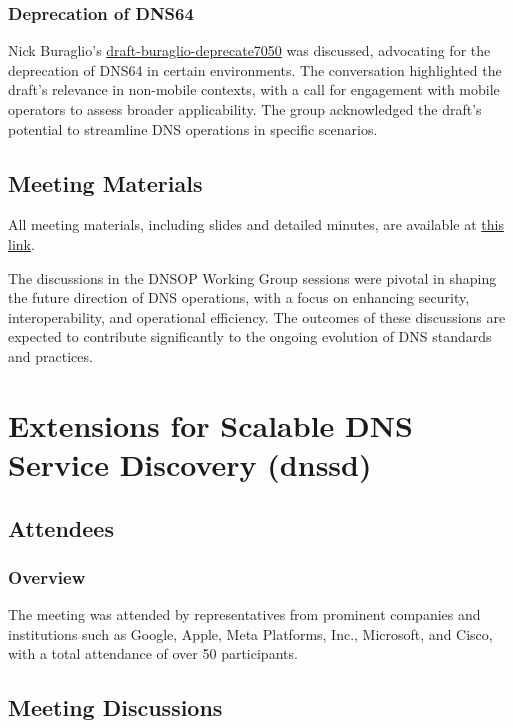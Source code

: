 \documentclass{article}
\begin{document}
\subsubsection{Deprecation of DNS64}
Nick Buraglio's \href{https://datatracker.ietf.org/doc/html/draft-buraglio-deprecate7050}{draft-buraglio-deprecate7050} was discussed, advocating for the deprecation of DNS64 in certain environments. The conversation highlighted the draft's relevance in non-mobile contexts, with a call for engagement with mobile operators to assess broader applicability. The group acknowledged the draft's potential to streamline DNS operations in specific scenarios.

\subsection{Meeting Materials}
All meeting materials, including slides and detailed minutes, are available at \href{https://notes.ietf.org/notes-ietf-121-dnsop}{this link}.

The discussions in the DNSOP Working Group sessions were pivotal in shaping the future direction of DNS operations, with a focus on enhancing security, interoperability, and operational efficiency. The outcomes of these discussions are expected to contribute significantly to the ongoing evolution of DNS standards and practices.



\newpage

\section{Extensions for Scalable DNS Service Discovery (dnssd)}

\subsection{Attendees}
\subsubsection{Overview}
The meeting was attended by representatives from prominent companies and institutions such as Google, Apple, Meta Platforms, Inc., Microsoft, and Cisco, with a total attendance of over 50 participants.

\subsection{Meeting Discussions}
\end{document}
